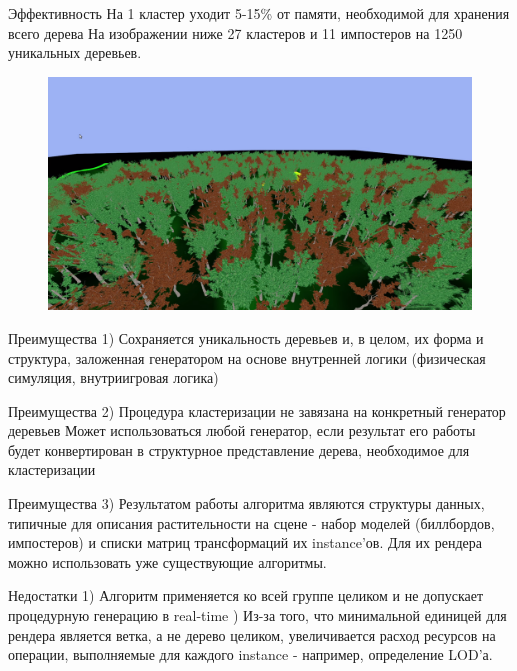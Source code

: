 \documentclass[14pt]{beamer}
\begin{document}
\begin{frame}{Эффективность}
На 1 кластер уходит 5-15\% от памяти, необходимой для хранения всего дерева\linebreak	
На изображении ниже 27 кластеров и 11 импостеров на 1250 уникальных деревьев. \linebreak	
\begin{figure}[hbtp]
\includegraphics[scale=0.137]{large.png}
\end{figure}
\end{frame}
\begin{frame}{Преимущества}
1) Сохраняется уникальность деревьев и, в целом, их форма и структура, заложенная генератором на основе внутренней логики (физическая симуляция, внутриигровая логика)\linebreak	
\end{frame}
\begin{frame}{Преимущества}
2) Процедура кластеризации не завязана на конкретный генератор деревьев
Может использоваться любой генератор, если результат его работы будет конвертирован в структурное представление дерева, необходимое для кластеризации\linebreak	
\end{frame}
\begin{frame}{Преимущества}
3) Результатом работы алгоритма являются структуры данных, типичные для описания растительности на сцене - набор моделей (биллбордов, импостеров) и списки матриц трансформаций их instance'ов. Для их рендера можно использовать уже существующие алгоритмы.
\end{frame}
\begin{frame}{Недостатки}
1) Алгоритм применяется ко всей группе целиком и не допускает процедурную генерацию в real-time ) Из-за того, что минимальной единицей для рендера является ветка, а не дерево целиком, увеличивается расход ресурсов на операции, выполняемые для каждого instance - например, определение LOD'а.
\end{frame}
\end{document}
